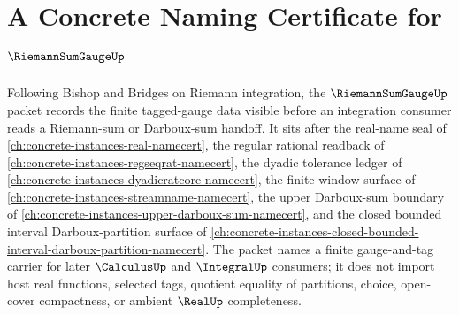 \chapter{A Concrete Naming Certificate for $\RiemannSumGaugeUp$}
\label{ch:concrete-instances-riemann-sum-gauge-namecert}

Following Bishop and Bridges on Riemann integration, the $\RiemannSumGaugeUp$ packet records the finite tagged-gauge data visible before an integration consumer reads a Riemann-sum or Darboux-sum handoff. It sits after the real-name seal of \autoref{ch:concrete-instances-real-namecert}, the regular rational readback of \autoref{ch:concrete-instances-regseqrat-namecert}, the dyadic tolerance ledger of \autoref{ch:concrete-instances-dyadicratcore-namecert}, the finite window surface of \autoref{ch:concrete-instances-streamname-namecert}, the upper Darboux-sum boundary of \autoref{ch:concrete-instances-upper-darboux-sum-namecert}, and the closed bounded interval Darboux-partition surface of \autoref{ch:concrete-instances-closed-bounded-interval-darboux-partition-namecert}. The packet names a finite gauge-and-tag carrier for later $\CalculusUp$ and $\IntegralUp$ consumers; it does not import host real functions, selected tags, quotient equality of partitions, choice, open-cover compactness, or ambient $\RealUp$ completeness.

